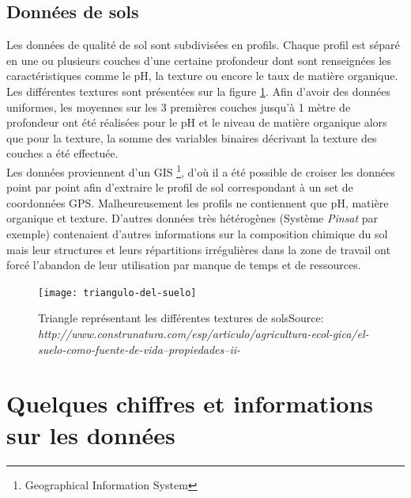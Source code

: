 \subsection{Données de sols} 
Les données de qualité de sol sont subdivisées en profils. Chaque profil est séparé en une ou plusieurs couches d’une certaine profondeur dont sont renseignées les caractéristiques comme le pH, la texture ou encore le taux de matière organique. Les différentes textures sont présentées sur la figure \ref{TriangleTexture}. Afin d'avoir des données uniformes, les moyennes sur les 3 premières couches jusqu'à 1 mètre de profondeur ont été réalisées pour le pH et le niveau de matière organique alors que pour la texture, la somme des variables binaires décrivant la texture des couches a été effectuée. \\


\noindent Les données proviennent d'un GIS \footnote{Geographical Information System}, d'où il a été possible de croiser les données point par point afin d'extraire le profil de sol correspondant à un set de coordonnées GPS. Malheureusement les profils ne contiennent que pH, matière organique et texture. D'autres données très hétérogènes (Système \textit{Pinsat} par exemple) contenaient d'autres informations sur la composition chimique du sol mais leur structures et leurs répartitions irrégulières dans la zone de travail ont forcé l'abandon de leur utilisation par manque de temps et de ressources.

\begin{figure}[H]
	\centering
	\texttt{[image: triangulo-del-suelo]}
	\caption{\label{TriangleTexture} Triangle représentant les différentes textures de sols\newline Source: \textit{http://www.construnatura.com/esp/articulo/agricultura-ecol-gica/el-suelo-como-fuente-de-vida--propiedades--ii-}}
\end{figure}





\newpage
\section{Quelques chiffres et informations sur les données}

